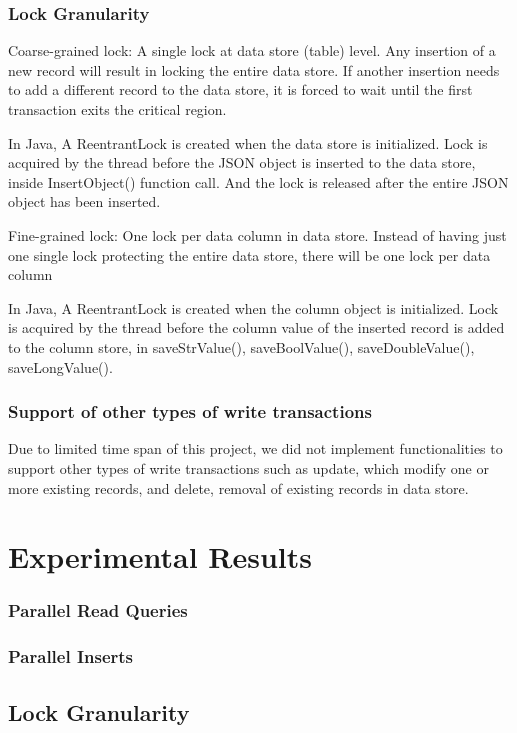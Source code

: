 \documentclass[11pt,journal,compsoc]{IEEEtran}
\begin{document}
\subsubsection{Lock Granularity}
Coarse-grained lock: A single lock at data store (table) level. Any insertion of a new record will result in locking the entire data store. If another insertion needs to add a different record to the data store, it is forced to wait until the first transaction exits the critical region.
 
In Java, A ReentrantLock is created when the data store is initialized. Lock is acquired by the thread before the JSON object is inserted to the data store, inside InsertObject() function call. And the lock is released after the entire JSON object has been inserted.
 
Fine-grained lock: One lock per data column in data store. Instead of having just one single lock protecting the entire data store, there will be one lock per data column
 
In Java, A ReentrantLock is created when the column object is initialized. Lock is acquired by the thread before the column value of the inserted record is added to the column store, in saveStrValue(), saveBoolValue(), saveDoubleValue(), saveLongValue().

\subsubsection{Support of other types of write transactions}
Due to limited time span of this project, we did not implement functionalities to support other types of write transactions such as update, which modify one or more existing records, and delete, removal of existing records in data store.

\section{Experimental Results}
\subsubsection{Parallel Read Queries}

\subsubsection{Parallel Inserts}

\subsection{Lock Granularity}
\end{document}
